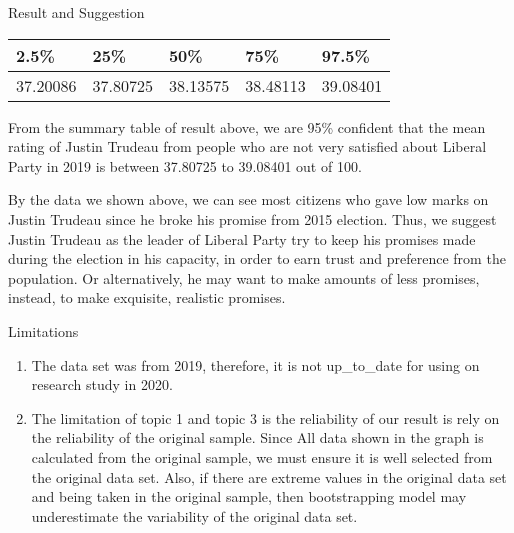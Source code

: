 \documentclass[
  ignorenonframetext,
]{beamer}
\providecommand{\tightlist}{%
  \setlength{\itemsep}{0pt}\setlength{\parskip}{0pt}}
\begin{document}
\begin{frame}{Result and Suggestion}
\protect\hypertarget{result-and-suggestion}{}
\begin{longtable}[]{@{}lllll@{}}
\toprule()
2.5\% & 25\% & 50\% & 75\% & 97.5\% \\
\midrule()
\endhead
37.20086 & 37.80725 & 38.13575 & 38.48113 & 39.08401 \\
\bottomrule()
\end{longtable}

From the summary table of result above, we are 95\% confident that the
mean rating of Justin Trudeau from people who are not very satisfied
about Liberal Party in 2019 is between 37.80725 to 39.08401 out of 100.~

By the data we shown above, we can see most citizens who gave low marks
on Justin Trudeau since he broke his promise from 2015 election. Thus,
we suggest Justin Trudeau as the leader of Liberal Party try to keep his
promises made during the election in his capacity, in order to earn
trust and preference from the population. Or alternatively, he may want
to make amounts of less promises, instead, to make exquisite, realistic
promises.
\end{frame}

\begin{frame}{Limitations}
\protect\hypertarget{limitations}{}
\begin{enumerate}
\tightlist
\item
  The data set was from 2019, therefore, it is not up\_to\_date for
  using on research study in 2020.\\
\item
  The limitation of topic 1 and topic 3 is the reliability of our result
  is rely on the reliability of the original sample. Since All data
  shown in the graph is calculated from the original sample, we must
  ensure it is well selected from the original data set. Also, if there
  are extreme values in the original data set and being taken in the
  original sample, then bootstrapping model may underestimate the
  variability of the original data set.\\
\end{enumerate}
\end{frame}
\end{document}

